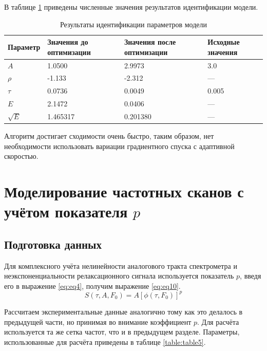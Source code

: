\documentclass{report}
\begin{document}
        В таблице \ref{table:table4} приведены численные значения результатов 
        идентификации модели.
        
        \begin{table}[ht]
            \caption{Результаты идентификации параметров модели}
            \label{table:table4}
            \centering
            \begin{tabular}{ | m{2.5cm} | m{2.5cm} | m{2.5cm} | m{2.5cm} | }
                \hline
                Параметр & Значения до оптимизации & Значения после оптимизации & Исходные значения \\
                \hline
                $A$ & 1.0500 & 2.9973 & 3.0 \\
                \hline
                $\rho$ & -1.133 & -2.312 & --- \\
                \hline
                $\tau$ & 0.0736 & 0.0049 & 0.005 \\
                \hline
                $E$ & 2.1472 & 0.0406 & --- \\
                \hline
                $\sqrt{E}$ & 1.465317 & 0.201380 & ---\\
                \hline
            \end{tabular}
        \end{table}

        Алгоритм достигает сходимости очень быстро, таким образом, нет необходимости 
        использовать вариации градиентного спуска с адаптивной скоростью.


        \chapter{Моделирование частотных сканов с учётом показателя $p$}

        \section{Подготовка данных}
        Для комплексного учёта нелинейности аналогового тракта спектрометра и 
        неэкспоненциальности релаксационного сигнала используется показатель $p$, 
        введя его в выражение \ref{eq:eq4}, получим выражение \ref{eq:eq10}.
        \begin{equation}
            \label{eq:eq10}
            S\left(\tau, A, F_0\right) = A\left[\phi\left(\tau,F_0\right)\right]^p
        \end{equation}

        Рассчитаем экспериментальные данные аналогично тому как это делалось в 
        предыдущей части, но принимая во внимание коэффициент $p$. Для расчёта 
        используется та же сетка частот, что и в предыдущем разделе. Параметры, 
        использованные для расчёта приведены в таблице \ref{table:table5}.
\end{document}
